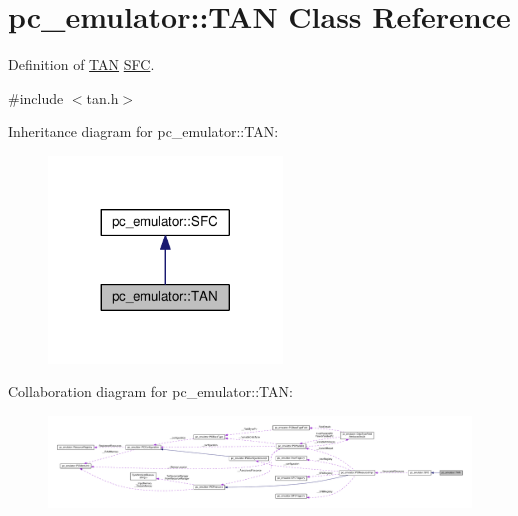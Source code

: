 \hypertarget{classpc__emulator_1_1TAN}{}\section{pc\+\_\+emulator\+:\+:T\+AN Class Reference}
\label{classpc__emulator_1_1TAN}


Definition of \hyperlink{classpc__emulator_1_1TAN}{T\+AN} \hyperlink{classpc__emulator_1_1SFC}{S\+FC}.  




{\ttfamily \#include $<$tan.\+h$>$}



Inheritance diagram for pc\+\_\+emulator\+:\+:T\+AN\+:\nopagebreak
\begin{figure}[H]
\begin{center}
\leavevmode
\includegraphics[width=176pt]{classpc__emulator_1_1TAN__inherit__graph}
\end{center}
\end{figure}


Collaboration diagram for pc\+\_\+emulator\+:\+:T\+AN\+:\nopagebreak
\begin{figure}[H]
\begin{center}
\leavevmode
\includegraphics[width=350pt]{classpc__emulator_1_1TAN__coll__graph}
\end{center}
\end{figure}
